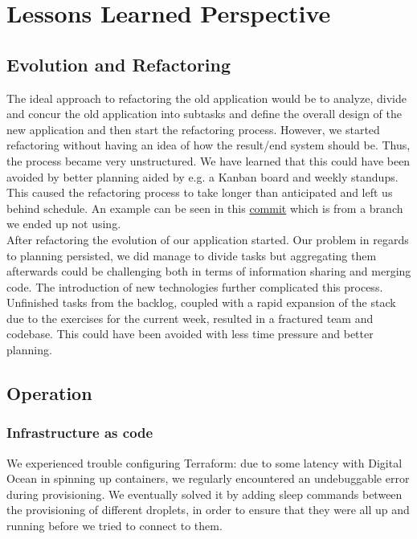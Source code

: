 \section{Lessons Learned Perspective}

\subsection{Evolution and Refactoring}
The ideal approach to refactoring the old application would be to analyze, divide and concur the old application into 
subtasks and define the overall design of the new application and then start the refactoring process. However, we started
refactoring without having an idea of how the result/end system should be. Thus, the process became very unstructured. 
We have learned that this could have been avoided by better planning aided by e.g. a Kanban board and weekly standups. This caused the 
refactoring process to take longer than anticipated and left us behind schedule. An example can be seen in this
\href{https://github.com/organizationGB/DevOps/commit/7bbccc97d6d69e90724b00e93e92334210490085}{commit} which is from a 
branch we ended up not using. \\

After refactoring the evolution of our application started. Our problem in regards to planning persisted, we did manage
to divide tasks but aggregating them afterwards could be challenging both in terms of information sharing and merging 
code. The introduction of new technologies further complicated this process. Unfinished tasks from the backlog, coupled
with a rapid expansion of the stack due to the exercises for the current week, resulted in a fractured team and
codebase. This could have been avoided with less time pressure and better planning.

\subsection{Operation}

\subsubsection{Infrastructure as code}
We experienced trouble configuring Terraform: due to some latency with Digital Ocean in spinning up containers, we regularly encountered an undebuggable error during provisioning. We eventually solved it by adding sleep commands between the provisioning of different droplets, in order to ensure that they were all up and running before we tried to connect to them.

